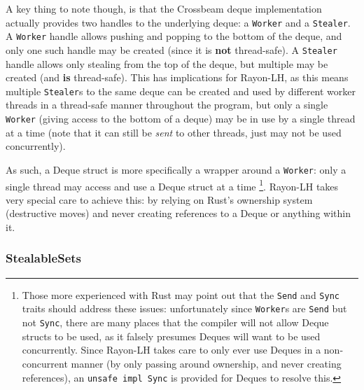 \documentclass[bsc,frontabs,singlespacing,parskip,deptreport,normalheadings]{infthesis}
\begin{document}
A key thing to note though, is that the Crossbeam deque implementation actually
provides two handles to the underlying deque: a \texttt{Worker} and a
\texttt{Stealer}. A \texttt{Worker} handle allows pushing and popping to the
bottom of the deque, and only one such handle may be created (since it is
\textbf{not} thread-safe). A \texttt{Stealer} handle allows only stealing from
the top of the deque, but multiple may be created (and \textbf{is} thread-safe).
This has implications for Rayon-LH, as this means multiple \texttt{Stealer}s to
the same deque can be created and used by different worker threads in a
thread-safe manner throughout the program, but only a single \texttt{Worker}
(giving access to the bottom of a deque) may be in use by a single thread at a
time (note that it can still be \textit{sent} to other threads, just may not be
used concurrently).

As such, a Deque struct is more specifically a wrapper around a \texttt{Worker}:
only a single thread may access and use a Deque struct at a time \footnote{Those
    more experienced with Rust may point out that the \texttt{Send} and
    \texttt{Sync} traits should address these issues: unfortunately since
    \texttt{Worker}s are \texttt{Send} but not \texttt{Sync}, there are many
    places that the compiler will not allow Deque structs to be used, as it
    falsely presumes Deques will want to be used concurrently. Since Rayon-LH
takes care to only ever use Deques in a non-concurrent manner (by only passing
around ownership, and never creating references), an \texttt{unsafe impl Sync}
is provided for Deques to resolve this.}. Rayon-LH takes very special care to
achieve this: by relying on Rust's ownership system (destructive moves) and
never creating references to a Deque or anything within it.

\subsubsection*{StealableSets}
\end{document}
